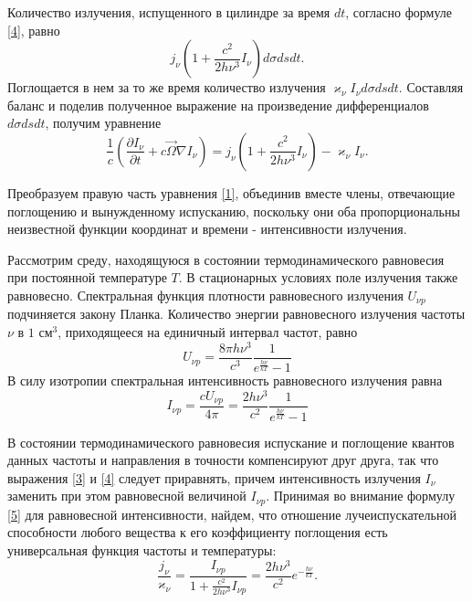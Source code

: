 Количество излучения, испущенного в цилиндре за время $dt$, согласно формуле \eqref{4}, равно
\begin {equation}
j_{\nu}(1 + \frac {c^2}{2h\nu^3}I_{\nu})d\sigma ds dt.
\end {equation}
Поглощается в нем за то же время количество излучения $\varkappa_{\nu} I_{\nu}d\sigma dsdt$. Составляя баланс и поделив полученное выражение на произведение дифференциалов $d\sigma dsdt$, получим уравнение
\begin {equation}
\frac{1}{c} \left(\frac{\partial I_{\nu}}{\partial t} + c \vec \Omega \nabla I_{\nu}\right) = j_{\nu} (1 + \frac {c^2}{2h\nu^3}I_{\nu}) - \varkappa_{\nu}I_{\nu}.
\label{1}
\end {equation}

Преобразуем правую часть уравнения \eqref{1}, объединив вместе члены, отвечающие поглощению и вынужденному испусканию, поскольку они оба пропорциональны неизвестной функции координат и времени - интенсивности излучения. 

Рассмотрим среду, находящуюся в состоянии термодинамического равновесия при постоянной температуре $T$. В стационарных условиях поле излучения также равновесно. Спектральная функция плотности равновесного излучения $U_{\nu p}$ подчиняется закону Планка. Количество энергии равновесного излучения частоты $\nu$ в $1 \text{ см}^3$, приходящееся на единичный интервал частот, равно
\begin {equation}
U_{\nu p} = \frac{8 \pi h \nu^3}{c^3} \frac {1}{e^{\frac{h\nu}{kT}} - 1}
\end {equation}
В силу изотропии спектральная интенсивность равновесного излучения равна
\begin {equation}
I_{\nu p} = \frac{cU_{\nu p}}{4\pi} = \frac{2h\nu^3}{c^2}\frac{1}{e^{\frac{h\nu}{kT}} - 1}
\label{5}
\end {equation}

В состоянии термодинамического равновесия испускание и поглощение квантов данных частоты и направления в точности компенсируют друг друга, так что выражения \eqref{3} и \eqref{4} следует приравнять, причем интенсивность излучения $I_{\nu}$ заменить при этом равновесной величиной $I_{\nu p}$. 
Принимая во внимание формулу \eqref{5} для равновесной интенсивности, найдем, что отношение лучеиспускательной способности любого вещества к его коэффициенту поглощения есть универсальная функция частоты и температуры:
\begin {equation}
\frac{j_{\nu}}{\varkappa_{\nu}} =  \frac{I_{\nu p}}{1+\frac{c^2}{2h\nu^3}I_{\nu p}} = \frac{2h\nu^3}{c^2}e^{-\frac{h\nu}{kT}}.
\label{6}
\end {equation}

